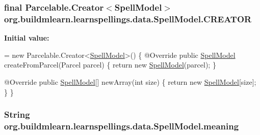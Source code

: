 \subsubsection[{\texorpdfstring{C\+R\+E\+A\+T\+OR}{CREATOR}}]{\setlength{\rightskip}{0pt plus 5cm}final Parcelable.\+Creator$<${\bf Spell\+Model}$>$ org.\+buildmlearn.\+learnspellings.\+data.\+Spell\+Model.\+C\+R\+E\+A\+T\+OR\hspace{0.3cm}{\ttfamily [static]}}\hypertarget{classorg_1_1buildmlearn_1_1learnspellings_1_1data_1_1SpellModel_a0e3f2ccfa761be30db7cadf658095cef}{}\label{classorg_1_1buildmlearn_1_1learnspellings_1_1data_1_1SpellModel_a0e3f2ccfa761be30db7cadf658095cef}
{\bfseries Initial value\+:}
\begin{DoxyCode}
= \textcolor{keyword}{new} Parcelable.Creator<\hyperlink{classorg_1_1buildmlearn_1_1learnspellings_1_1data_1_1SpellModel_a9e266b1f4548b4c1f8e7ffc7d15dd06a}{SpellModel}>() \{
        @Override
        \textcolor{keyword}{public} \hyperlink{classorg_1_1buildmlearn_1_1learnspellings_1_1data_1_1SpellModel_a9e266b1f4548b4c1f8e7ffc7d15dd06a}{SpellModel} createFromParcel(Parcel parcel) \{
            \textcolor{keywordflow}{return} \textcolor{keyword}{new} \hyperlink{classorg_1_1buildmlearn_1_1learnspellings_1_1data_1_1SpellModel_a9e266b1f4548b4c1f8e7ffc7d15dd06a}{SpellModel}(parcel);
        \}

        @Override
        \textcolor{keyword}{public} \hyperlink{classorg_1_1buildmlearn_1_1learnspellings_1_1data_1_1SpellModel_a9e266b1f4548b4c1f8e7ffc7d15dd06a}{SpellModel}[] newArray(\textcolor{keywordtype}{int} size) \{
            \textcolor{keywordflow}{return} \textcolor{keyword}{new} \hyperlink{classorg_1_1buildmlearn_1_1learnspellings_1_1data_1_1SpellModel_a9e266b1f4548b4c1f8e7ffc7d15dd06a}{SpellModel}[size];
        \}
    \}
\end{DoxyCode}
\subsubsection[{\texorpdfstring{meaning}{meaning}}]{\setlength{\rightskip}{0pt plus 5cm}String org.\+buildmlearn.\+learnspellings.\+data.\+Spell\+Model.\+meaning\hspace{0.3cm}{\ttfamily [private]}}\hypertarget{classorg_1_1buildmlearn_1_1learnspellings_1_1data_1_1SpellModel_a5869ecb2ab5a4ffc9f3ff0944ad40f0b}{}\label{classorg_1_1buildmlearn_1_1learnspellings_1_1data_1_1SpellModel_a5869ecb2ab5a4ffc9f3ff0944ad40f0b}

